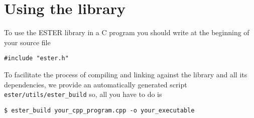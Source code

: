 \section{Using the library}

To use the ESTER library in a C program you should write at the beginning of your source file
\begin{verbatim}
#include "ester.h"
\end{verbatim}
To facilitate the process of compiling and linking against the library and all its dependencies, we provide an automatically generated
script {\tt ester/utils/ester\_build} so, all you have to do is
\begin{verbatim}
$ ester_build your_cpp_program.cpp -o your_executable
\end{verbatim} 





